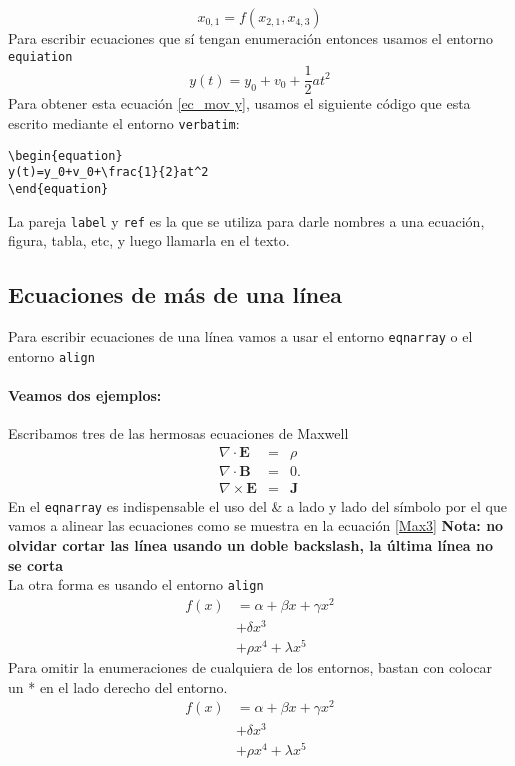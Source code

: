 \documentclass[onecolumn]{article} %
\begin{document}
$$x_{0,1}=f(x_{2,1},x_{4,3})$$
Para escribir ecuaciones que sí tengan enumeración entonces usamos el entorno \verb+equiation+
\begin{equation}
\label{ec_mov y} %
y(t)=y_0+v_0+\frac{1}{2}at^2
\end{equation}
Para obtener esta ecuación \ref{ec_mov y}, usamos el siguiente código que esta escrito mediante el entorno \verb+verbatim+:
\begin{verbatim}
\begin{equation}
y(t)=y_0+v_0+\frac{1}{2}at^2
\end{equation}
\end{verbatim}
La pareja \verb+label+ y \verb+ref+ es la que se utiliza para darle nombres a una ecuación, figura, tabla, etc, y luego llamarla en el texto.
\subsection{Ecuaciones de más de una línea}
Para escribir ecuaciones de una línea vamos a usar el entorno \verb+eqnarray+ o el entorno \verb+align+ 
\paragraph{Veamos dos ejemplos:}
Escribamos tres de las hermosas ecuaciones de Maxwell
\begin{eqnarray}
\label{Max3}
\nabla\cdot\mathbf{E} &=&\rho \nonumber\\
\nabla\cdot\mathbf{B} &=&0. \\
\nabla\times\mathbf{E} &=& \mathbf J \nonumber
\end{eqnarray}
En el \verb+eqnarray+ es indispensable el uso del \& a lado y lado del símbolo por el que vamos a alinear las ecuaciones como se muestra en la ecuación \ref{Max3}
{\bf Nota: no olvidar cortar las línea usando un doble backslash, la última línea no se corta}
\\
La otra forma es usando el entorno \verb+align+
\begin{align}
f(x)&=\alpha + \beta x + \gamma x^2 \nonumber \\ 
&+\delta x^3  \\
&+\rho x^4+ \lambda x^5 \nonumber
\end{align}
Para omitir la enumeraciones de cualquiera de los entornos, bastan con colocar un * en el lado derecho del entorno.
\begin{align*}
f(x)&=\alpha + \beta x + \gamma x^2 \\ 
&+\delta x^3  \\
&+\rho x^4+ \lambda x^5 
\end{align*}
\end{document}
